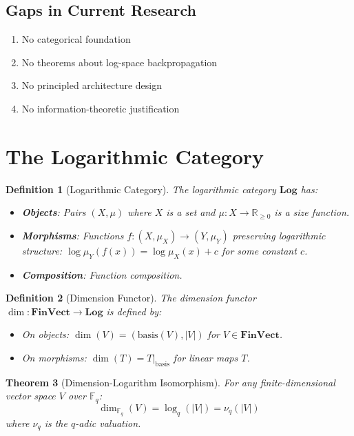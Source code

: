 \documentclass{article}
\newtheorem{theorem}{Theorem}
\newtheorem{definition}[theorem]{Definition}
\begin{document}
\subsection{Gaps in Current Research}

\begin{enumerate}
    \item No categorical foundation
    \item No theorems about log-space backpropagation
    \item No principled architecture design
    \item No information-theoretic justification
\end{enumerate}

\section{The Logarithmic Category}

\begin{definition}[Logarithmic Category]
The logarithmic category $\mathbf{Log}$ has:
\begin{itemize}
    \item \textbf{Objects}: Pairs $(X, \mu)$ where $X$ is a set and $\mu: X \to \mathbb{R}_{\geq 0}$ is a size function.
    \item \textbf{Morphisms}: Functions $f: (X, \mu_X) \to (Y, \mu_Y)$ preserving logarithmic structure: $\log \mu_Y(f(x)) = \log \mu_X(x) + c$ for some constant $c$.
    \item \textbf{Composition}: Function composition.
\end{itemize}
\end{definition}

\begin{definition}[Dimension Functor]
The dimension functor $\dim: \mathbf{FinVect} \to \mathbf{Log}$ is defined by:
\begin{itemize}
    \item On objects: $\dim(V) = (\text{basis}(V), |V|)$ for $V \in \mathbf{FinVect}$.
    \item On morphisms: $\dim(T) = T|_{\text{basis}}$ for linear maps $T$.
\end{itemize}
\end{definition}

\begin{theorem}[Dimension-Logarithm Isomorphism]
For any finite-dimensional vector space $V$ over $\mathbb{F}_q$:
\[
\dim_{\mathbb{F}_q}(V) = \log_q(|V|) = \nu_q(|V|)
\]
where $\nu_q$ is the $q$-adic valuation.
\end{theorem}
\end{document}
